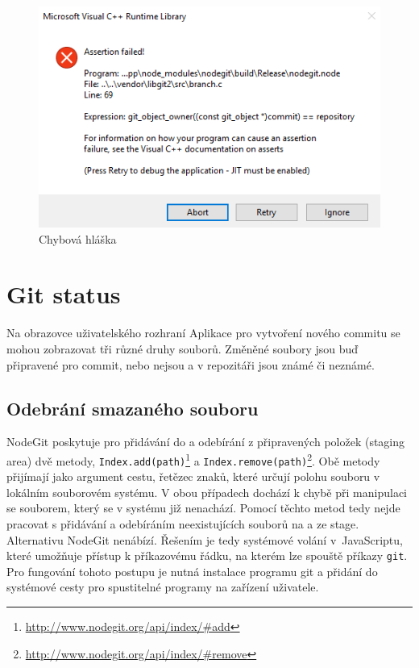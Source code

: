 \FloatBarrier
\begin{figure}[h]
	\centering
	\includegraphics[width=\textwidth]{sections/nodegit/images/branch.png}
	\caption{Chybová hláška}
\end{figure}
\FloatBarrier

\section{Git status}

Na obrazovce uživatelského rozhraní Aplikace pro vytvoření nového commitu se mohou zobrazovat tři různé druhy souborů. Změněné soubory jsou buď připravené pro commit, nebo nejsou a v repozitáři jsou známé či neznámé.

\subsection{Odebrání smazaného souboru}

NodeGit poskytuje pro přidávání do a odebírání z připravených položek (staging area) dvě metody, \texttt{Index.add(path)}\footnote{\url{http://www.nodegit.org/api/index/\#add}} a \texttt{Index.remove(path)}\footnote{\url{http://www.nodegit.org/api/index/\#remove}}. Obě metody přijímají jako argument cestu, řetězec znaků, které určují polohu souboru v lokálním souborovém systému. V obou případech dochází k chybě při manipulaci se souborem, který se v systému již nenachází. Pomocí těchto metod tedy nejde pracovat s přidávání a odebíráním neexistujících souborů na a ze stage. Alternativu NodeGit nenábízí. Řešením je tedy systémové volání v~JavaScriptu, které umožňuje přístup k příkazovému řádku, na kterém lze spouště příkazy \texttt{git}. Pro fungování tohoto postupu je nutná instalace programu git a přidání do systémové cesty pro spustitelné programy na zařízení uživatele.


